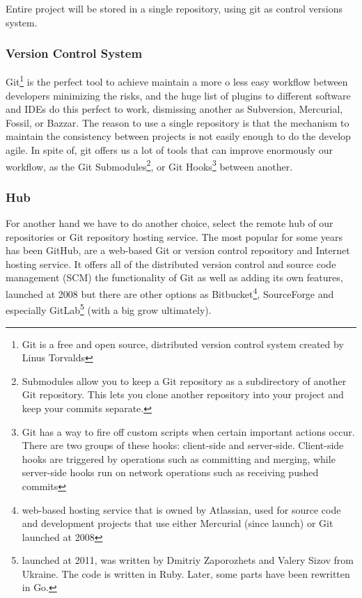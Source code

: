 Entire project will be stored in a single repository, using git as control
versions system.

\subsubsection{Version Control System}

Git\footnote{Git is a free and open source, distributed version control system
created by Linus Torvalds} is the perfect tool to achieve maintain a more o
less easy workflow between developers minimizing the risks, and the huge list of
plugins to different software and IDEs do this perfect to work, dismissing another
as Subversion, Mercurial, Fossil, or Bazzar.
\intro
The reason to use a single repository is that the mechanism to maintain the
consistency between projects is not easily enough to do the develop agile.
In spite of, git offers us a lot of tools that can improve enormously our
workflow, as the Git Submodules\footnote{Submodules allow you to keep a
Git repository as a subdirectory of another Git repository.
This lets you clone another repository into your project and keep your commits
separate.}, or Git Hooks\footnote{Git has a way to fire off custom scripts when
certain important actions occur. There are two groups of these hooks:
client-side and server-side. Client-side hooks are triggered by operations such
as committing and merging, while server-side hooks run on network operations
such as receiving pushed commits} between another.

\subsubsection{Hub}

For another hand we have to do another choice, select the remote hub of our repositories
or Git repository hosting service. The most popular for some years has been GitHub,
are a web-based Git or version control repository and Internet hosting service.
It offers all of the distributed version control and source code management (SCM)
the functionality of Git as well as adding its own features,
launched at 2008
but there are other options as Bitbucket\footnote{web-based hosting service
that is owned by Atlassian, used for source code and development projects that
use either Mercurial (since launch) or Git
launched at 2008},
SourceForge and especially
GitLab\footnote{launched at 2011, was written by Dmitriy Zaporozhets and Valery
Sizov from Ukraine. The code is written in Ruby. Later, some parts have been
rewritten in Go.} (with a big grow ultimately). \pagebreak


